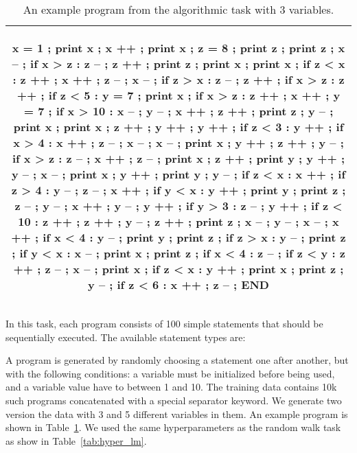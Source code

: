 \documentclass{article} \usepackage{iclr2021_conference}
\newcommand{\tab}[1]{Table~\ref{tab:#1}}
\begin{document}
\begin{table}
    \centering
    \begin{tabular}{|c|}
        \hline 
        \begin{minipage}{\textwidth}
            \scriptsize
            \begin{spverbatim}x = 1 ; print x ; x ++ ; print x ; z = 8 ; print z ; print z ; x -- ; if x > z : z -- ; z ++ ; print z ; print x ; print x ; if z < x : z ++ ; x ++ ; z -- ; x -- ; if z > x : z -- ; z ++ ; if x > z : z ++ ; if z < 5 : y = 7 ; print x ; if x > z : z ++ ; x ++ ; y = 7 ; if x > 10 : x -- ; y -- ; x ++ ; z ++ ; print z ; y -- ; print x ; print x ; z ++ ; y ++ ; y ++ ; if z < 3 : y ++ ; if x > 4 : x ++ ; z -- ; x -- ; x -- ; print x ; y ++ ; z ++ ; y -- ; if x > z : z -- ; x ++ ; z -- ; print x ; z ++ ; print y ; y ++ ; y -- ; x -- ; print x ; y ++ ; print y ; y -- ; if z < x : x ++ ; if z > 4 : y -- ; z -- ; x ++ ; if y < x : y ++ ; print y ; print z ; z -- ; y -- ; x ++ ; y -- ; y ++ ; if y > 3 : z -- ; y ++ ; if z < 10 : z ++ ; z ++ ; y -- ; z ++ ; print z ; x -- ; y -- ; x -- ; x ++ ; if x < 4 : y -- ; print y ; print z ; if z > x : y -- ; print z ; if y < x : x -- ; print x ; print z ; if x < 4 : z -- ; if z < y : z ++ ; z -- ; x -- ; print x ; if z < x : y ++ ; print x ; print z ; y -- ; if z < 6 : x ++ ; z -- ; END \end{spverbatim}
        \end{minipage} 
        \\
        \hline
    \end{tabular}
    \caption{An example program from the algorithmic task with 3 variables.}
    \label{tab:algo_example}
\end{table}

In this task, each program consists of 100 simple statements that should be sequentially executed. The available statement types are:
A program is generated by randomly choosing a statement one after another, but with the following conditions: a variable must be initialized before being used, and a variable value have to between 1 and 10. 
The training data contains 10k such programs concatenated with a special separator keyword.
We generate two version the data with 3 and 5 different variables in them. 
An example program is shown in \tab{algo_example}.
We used the same hyperparameters as the random walk task as show in \tab{hyper_lm}.
\end{document}
